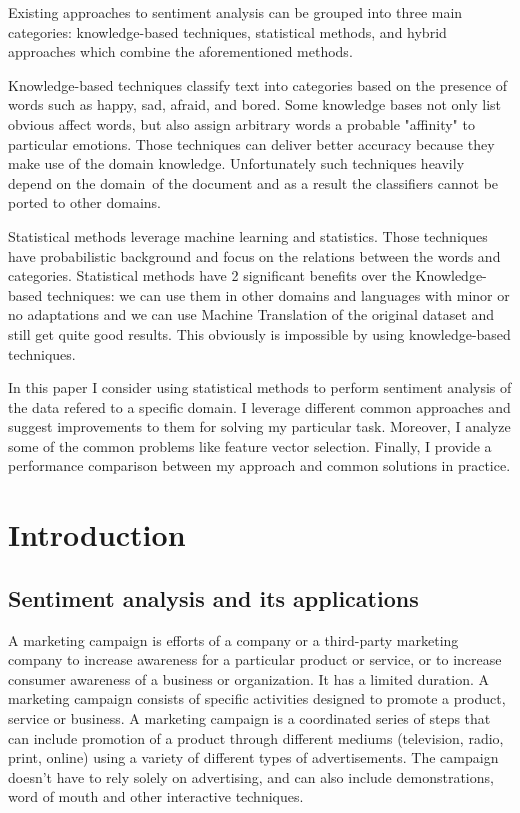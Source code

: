 \documentclass[12pt]{report}
\begin{document}
Existing approaches to sentiment analysis can be grouped into three main categories: knowledge-based techniques, statistical methods, and hybrid approaches which combine the aforementioned methods.

Knowledge-based techniques classify text into categories based on the presence of words such as happy, sad, afraid, and bored. Some knowledge bases not only list obvious affect words, but also assign arbitrary words a probable "affinity" to particular emotions. Those techniques can deliver better accuracy because they make use of the domain knowledge. Unfortunately such techniques heavily depend on the domain of the document and as a result the classifiers cannot be ported to other domains.

Statistical methods leverage machine learning and statistics. Those techniques have probabilistic background and focus on the relations between the words and categories. Statistical methods have 2 significant benefits over the Knowledge-based techniques: we can use them in other domains and languages with minor or no adaptations and we can use Machine Translation of the original dataset and still get quite good results. This obviously is impossible by using knowledge-based techniques.

In this paper I consider using statistical methods to perform sentiment analysis of the data refered to a specific domain. I leverage different common approaches and suggest improvements to them for solving my particular task. Moreover, I analyze some of the common problems like feature vector selection. Finally, I provide a performance comparison between my approach and common solutions in practice.

\newpage


\chapter{Introduction}

\section{Sentiment analysis and its applications}

A marketing campaign is efforts of a company or a third-party marketing company to increase awareness for a particular product or service, or to increase consumer awareness of a business or organization. It has a limited duration. A marketing campaign consists of specific activities designed to promote a product, service or business. A marketing campaign is a coordinated series of steps that can include promotion of a product through different mediums (television, radio, print, online) using a variety of different types of advertisements. The campaign doesn't have to rely solely on advertising, and can also include demonstrations, word of mouth and other interactive techniques.
\end{document}

